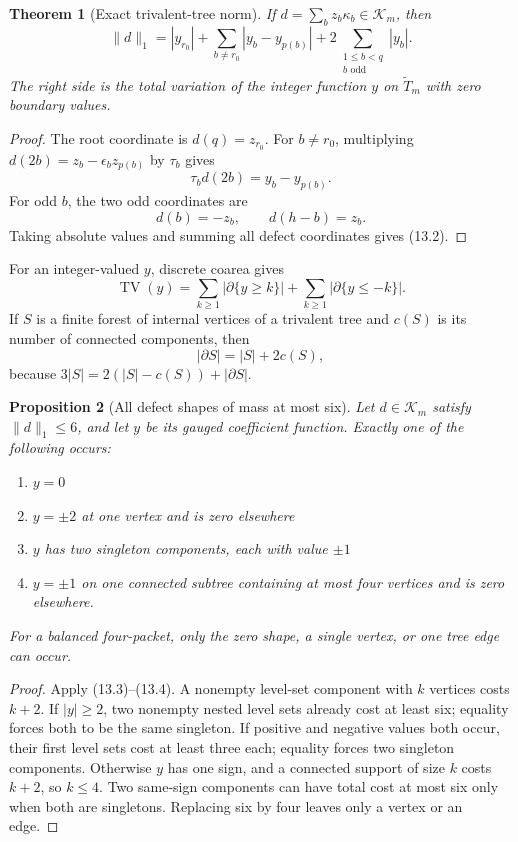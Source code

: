 \documentclass[11pt,oneside]{book}
\newtheorem{theorem}{Theorem}[chapter]
\newtheorem{proposition}[theorem]{Proposition}
\theoremstyle{definition}
\theoremstyle{remark}
\begin{document}
\begin{theorem}[Exact trivalent-tree norm]
If \(d=\sum_bz_b\kappa_b\in\mathcal K_m\), then
\[
\boxed{
\|d\|_1
=|y_{r_0}|
+\sum_{b\ne r_0}|y_b-y_{p(b)}|
+2\sum_{\substack{1\le b<q\\ b\text{ odd}}}|y_b|.
}
\tag{13.2}
\]
The right side is the total variation of the integer function \(y\) on \(\widetilde T_m\) with zero boundary values.
\end{theorem}
\begin{proof}
The root coordinate is \(d(q)=z_{r_0}\). For \(b\ne r_0\), multiplying
\(d(2b)=z_b-\epsilon_bz_{p(b)}\) by \(\tau_b\) gives
\[
\tau_bd(2b)=y_b-y_{p(b)}.
\]
For odd \(b\), the two odd coordinates are
\[
d(b)=-z_b,
\qquad
d(h-b)=z_b.
\]
Taking absolute values and summing all defect coordinates gives (13.2).
\end{proof}

For an integer-valued \(y\), discrete coarea gives
\[
\operatorname{TV}(y)
=
\sum_{k\ge1}|\partial\{y\ge k\}|
+
\sum_{k\ge1}|\partial\{y\le-k\}|.
\tag{13.3}
\]
If \(S\) is a finite forest of internal vertices of a trivalent tree and \(c(S)\) is its number of connected components, then
\[
|\partial S|=|S|+2c(S),
\tag{13.4}
\]
because \(3|S|=2(|S|-c(S))+|\partial S|\).

\begin{proposition}[All defect shapes of mass at most six]
Let \(d\in\mathcal K_m\) satisfy \(\|d\|_1\le6\), and let \(y\) be its gauged coefficient function. Exactly one of the following occurs:
\begin{enumerate}
\item \(y=0\)
\item \(y=\pm2\) at one vertex and is zero elsewhere
\item \(y\) has two singleton components, each with value \(\pm1\)
\item \(y=\pm1\) on one connected subtree containing at most four vertices and is zero elsewhere.
\end{enumerate}
For a balanced four-packet, only the zero shape, a single vertex, or one tree edge can occur.
\end{proposition}
\begin{proof}
Apply (13.3)--(13.4). A nonempty level-set component with \(k\) vertices costs \(k+2\). If \(|y|\ge2\), two nonempty nested level sets already cost at least six; equality forces both to be the same singleton. If positive and negative values both occur, their first level sets cost at least three each; equality forces two singleton components. Otherwise \(y\) has one sign, and a connected support of size \(k\) costs \(k+2\), so \(k\le4\). Two same-sign components can have total cost at most six only when both are singletons. Replacing six by four leaves only a vertex or an edge.
\end{proof}
\end{document}
